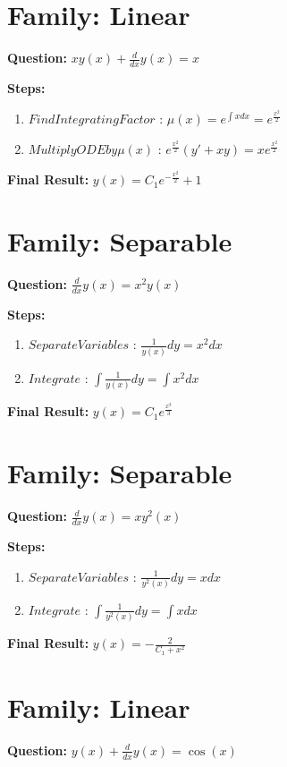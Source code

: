 \documentclass{article}
\begin{document}
\section*{Family: Linear}
\textbf{Question:} $x y{\left(x \right)} + \frac{d}{d x} y{\left(x \right)} = x$

\textbf{Steps:}
\begin{enumerate}
\item $Find Integrating Factor$ :  $\mu(x) = e^{\int x dx} = e^{\frac{x^{2}}{2}}$
\item $Multiply ODE by \mu(x)$ :  $e^{\frac{x^{2}}{2}}(y' + xy) = x e^{\frac{x^{2}}{2}}$
\end{enumerate}
\textbf{Final Result:} $y{\left(x \right)} = C_{1} e^{- \frac{x^{2}}{2}} + 1$

\section*{Family: Separable}
\textbf{Question:} $\frac{d}{d x} y{\left(x \right)} = x^{2} y{\left(x \right)}$

\textbf{Steps:}
\begin{enumerate}
\item $Separate Variables$ :  $\frac{1}{y{\left(x \right)}} dy = x^{2} dx$
\item $Integrate$ :  $\int \frac{1}{y{\left(x \right)}} dy = \int x^{2} dx$
\end{enumerate}
\textbf{Final Result:} $y{\left(x \right)} = C_{1} e^{\frac{x^{3}}{3}}$

\section*{Family: Separable}
\textbf{Question:} $\frac{d}{d x} y{\left(x \right)} = x y^{2}{\left(x \right)}$

\textbf{Steps:}
\begin{enumerate}
\item $Separate Variables$ :  $\frac{1}{y^{2}{\left(x \right)}} dy = x dx$
\item $Integrate$ :  $\int \frac{1}{y^{2}{\left(x \right)}} dy = \int x dx$
\end{enumerate}
\textbf{Final Result:} $y{\left(x \right)} = - \frac{2}{C_{1} + x^{2}}$

\section*{Family: Linear}
\textbf{Question:} $y{\left(x \right)} + \frac{d}{d x} y{\left(x \right)} = \cos{\left(x \right)}$
\end{document}
